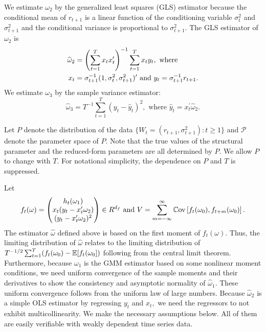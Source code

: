 We estimate $\omega _{2}$ by the generalized least squares (GLS) estimator because the conditional mean of $r_{t+1}$ is a linear function of the conditioning variable $\sigma _{t}^{2}$ and $\sigma _{t+1}^{2}$ and the conditional variance is proportional to $\sigma _{t+1}^{2}.$ The GLS estimator of $\omega _{2}$ is
%
\begin{align}
    \widehat{\omega }_{2} &= \left( \sum_{t=1}^{T}x_{t}x_{t}^{\prime }\right) ^{-1}\sum_{t=1}^{T}x_{t}y_{t},\text{ where }  \notag \\ 
%
    x_{t} &= \sigma _{t+1}^{-1}(1,\sigma _{t}^{2},\sigma _{t+1}^{2})^{\prime } \text{ and }y_{t}=\sigma _{t+1}^{-1}r_{t+1}.  \label{omega 2 est}
\end{align}
%
We estimate $\omega_{3}$ by the sample variance estimator:
%
\begin{equation}
    \label{omega 3 est}
    \widehat{\omega }_{3}=T^{-1}\sum_{t=1}^{T}\left( y_{t}-\widehat{y}_{t}\right) ^{2},\text{ where }\widehat{y}_{t}=x_{t}^{\prime }\widehat{ \omega }_{2}.  
\end{equation}

Let $P$ denote the distribution of the data $\{W_{t}=(r_{t+1}, \sigma _{t+1}^{2}):t\geq 1\}$ and $\mathcal{P}$ denote the parameter space of $P$. Note that the true values of the structural parameter and the reduced-form parameters are all determined by $P.$ We allow $P$ to change with $T.$ For notational simplicity, the dependence on $P$ and $T$ is suppressed.

Let 
%
\begin{equation}
    f_{t}(\omega) = 
%
    \begin{pmatrix}
        h_{t}(\omega _{1}) \\ 
        x_{t}(y_{t}-x_{t}^{\prime }\omega _{2}) \\ 
        (y_{t}-x_{t}^{\prime }\omega _{2})^{2}%
    \end{pmatrix}
%
     \in R^{d_{f}}\text{ and } 
%
     V =\sum_{m=-\infty }^{\infty }\Cov\left[f_{t}(\omega _{0}),f_{t+m}(\omega _{0})\right].
\end{equation}
%
The estimator $\widehat{\omega }$ defined above is based on the first moment of $f_{t}(\omega ).$ Thus, the limiting distribution of $\widehat{\omega }$ relates to the limiting distribution of $T^{-1/2}\sum_{t=1}^{T}(f_{t}(\omega _{0})-\operatorname{\mathbb{E}}[f_{t}(\omega _{0}])$ following from the central limit theorem. Furthermore, because $\omega _{1}$ is the GMM estimator based on some nonlinear moment conditions, we need uniform convergence of the sample moments and their derivatives to show the consistency and asymptotic normality of $\widehat{\omega }_{1}.$ These uniform convergence follows from the uniform law of large numbers. Because $\widehat{\omega }_{2}$ is a simple OLS estimator by regressing $y_{t}$ and $x_{t},$ we need the regressors to not exhibit multicollinearity. We make the necessary assumptions below. All of them are easily verifiable with weakly dependent time series data.

